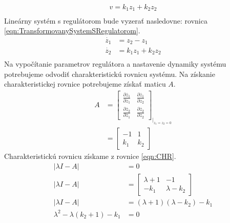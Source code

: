 \documentclass[../main.tex]{subfiles}
\begin{document}
\begin{equation}
	\begin{split}
		v = k_1z_1 + k_2z_2 \\
	\end{split}
	\label{eqn:LinReg}
\end{equation}
Lineárny systém s regulátorom bude vyzerať nasledovne: rovnica \ref{eqn:TransformovanySystemSRegulatorom}. 
\begin{equation}
	\begin{aligned}
	\dot{z_1}  & = z_2 - z_1 \\
	 \dot{z_2} & = k_1z_1 + k_2z_2 \\
	\end{aligned}
	\label{eqn:TransformovanySystemSRegulatorom}
\end{equation}
Na vypočítanie parametrov regulátora a nastavenie dynamiky systému potrebujeme odvodiť charakteristickú rovnicu systému.
Na získanie charakteristickej rovnice potrebujeme získať maticu $A$.
\begin{equation}
\begin{aligned} 
 A  & = \begin{bmatrix} \frac{\partial \dot{z_1}}{\partial z_1}& \frac{\partial \dot{z_1}}{\partial z_2}\\ \frac{\partial \dot{z_2}}{\partial z_1}&\frac{\partial \dot{z_2}}{\partial z_2} \end{bmatrix}_{|_{z_1 = z_2 = 0}} \\
 & = \begin{bmatrix} -1 & 1\\ k_1 & k_2 \end{bmatrix} \
 \end{aligned}
 \label{eqn:A}
\end{equation}
Charakteristickú rovnicu získame z rovnice \ref{eqn:CHR}.
\begin{equation}
\begin{aligned} 
 |\lambda I - A| & = 0\\
|\lambda I - A| & = \begin{bmatrix} \lambda +1 & -1\\ -k_1 & \lambda -k_2 \end{bmatrix} \\
|\lambda I - A| & = (\lambda + 1)(\lambda - k_2) - k_1\\
\lambda^2 - \lambda(k_2+1) - k_1 &= 0\\ 
\end{aligned}
\label{eqn:CHR}
\end{equation}
\end{document}
